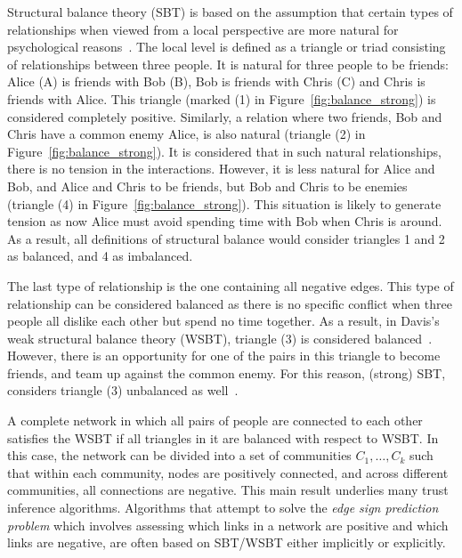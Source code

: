 \documentclass[acmtweb]{acmsmall}
\begin{document}
Structural balance theory (SBT) is based on the assumption that
certain types of relationships when viewed from a local perspective
are more natural for psychological reasons~\cite{kleinberg-book}. The
local level is defined as a triangle or triad consisting of
relationships between three people.  It is natural for three people to
be friends: Alice (A) is friends with Bob (B), Bob is friends with
Chris (C) and Chris is friends with Alice. This triangle (marked (1)
in Figure~\ref{fig:balance_strong}) is considered completely
positive. Similarly, a relation where two friends, Bob and Chris have
a common enemy Alice, is also natural (triangle (2) in
Figure~\ref{fig:balance_strong}). It is considered that in such
natural relationships, there is no tension in the
interactions. However, it is less natural for Alice and Bob, and Alice
and Chris to be friends, but Bob and Chris to be enemies (triangle (4)
in Figure~\ref{fig:balance_strong}). This situation is likely to
generate tension as now Alice must avoid spending time with Bob when
Chris is around. As a result, all definitions of structural balance
would consider triangles 1 and 2 as balanced, and 4 as imbalanced.

The last type of relationship is the one containing all negative
edges. This type of relationship can be considered balanced as there
is no specific conflict when three people all dislike each other but
spend no time together. As a result, in Davis's weak structural balance theory
(WSBT), triangle (3) is considered balanced~\cite{kleinberg-book}\cite{Davis:67}.  However, there is an
opportunity for one of the pairs in this triangle to become friends,
and team up against the common enemy. For this reason, (strong) SBT,
considers triangle (3) unbalanced as well~\cite{Cartwright:56}\cite{kleinberg-book}.

A complete network in which all pairs of people are connected to each
other satisfies the WSBT if all triangles in it are balanced with
respect to WSBT. In this case, the network can be divided into a set
of communities $C_1,\ldots, C_k$ such that within each community,
nodes are positively connected, and across different communities, all
connections are negative. This main result underlies many trust
inference algorithms. Algorithms that attempt to solve the {\it edge
  sign prediction problem} which involves assessing which links in a
network are positive and which links are negative, are often based on
SBT/WSBT either implicitly or explicitly.
\end{document}
